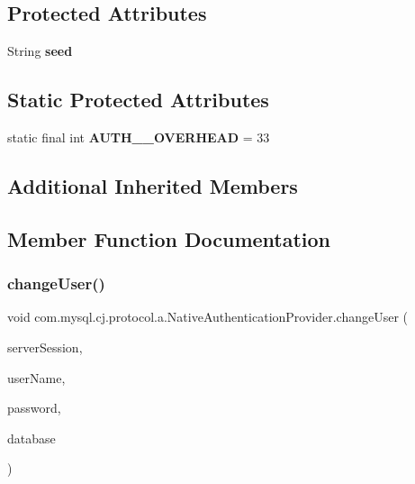 \subsection*{Protected Attributes}
\begin{DoxyCompactItemize}
\item 
\mbox{\label{classcom_1_1mysql_1_1cj_1_1protocol_1_1a_1_1_native_authentication_provider_a892979fa3727266691d4cbb0386adca2}} 
String {\bfseries seed}
\end{DoxyCompactItemize}
\subsection*{Static Protected Attributes}
\begin{DoxyCompactItemize}
\item 
\mbox{\label{classcom_1_1mysql_1_1cj_1_1protocol_1_1a_1_1_native_authentication_provider_a49df77ded491c1f4b77a3f1dddeb33a5}} 
static final int {\bfseries A\+U\+T\+H\+\_\+\_\+\+O\+V\+E\+R\+H\+E\+AD} = 33
\end{DoxyCompactItemize}
\subsection*{Additional Inherited Members}


\subsection{Member Function Documentation}
\mbox{\label{classcom_1_1mysql_1_1cj_1_1protocol_1_1a_1_1_native_authentication_provider_a5cf1296206b1d2ceb53440428a37d6f8}} 
\subsubsection{\texorpdfstring{change\+User()}{changeUser()}}
{\footnotesize\ttfamily void com.\+mysql.\+cj.\+protocol.\+a.\+Native\+Authentication\+Provider.\+change\+User (\begin{DoxyParamCaption}\item[{\mbox{\hyperlink{interfacecom_1_1mysql_1_1cj_1_1protocol_1_1_server_session}{Server\+Session}}}]{server\+Session,  }\item[{String}]{user\+Name,  }\item[{String}]{password,  }\item[{String}]{database }\end{DoxyParamCaption})}

